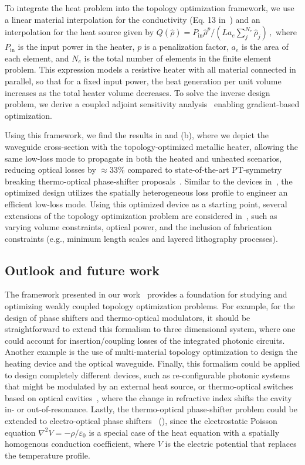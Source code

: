  To integrate the heat problem into the 
 topology optimization framework, we use a linear material interpolation 
for the conductivity (Eq. 13 in~\cite{ownpub0}) and an interpolation for the heat source given by $
 Q(\hat{\rho})=P_{\text{in}} \hat{\rho}^p / \left( L a_e \sum^{N_\text{e}}_j \hat{\rho}_j \right)\,,
$
where $P_\text{in}$ is the input power in the heater, $p$ is a penalization factor, $a_e$ is the area of each element, and 
$N_e$ is the total number of elements in the finite element problem. 
This expression models a resistive heater with all material connected in parallel, so that for a fixed input power, the heat 
generation per unit volume increases as the total heater volume decreases.
To solve the inverse design
problem, we derive a coupled adjoint sensitivity analysis~\cite{ownpub0} enabling gradient-based optimization.

Using this framework, we find the results in  and  (b), where we depict the waveguide cross-section with the topology-optimized metallic heater,
allowing the same low-loss mode to propagate in both the heated and unheated scenarios,
reducing optical losses by $\approx 33 \%$ compared to state-of-the-art PT-symmetry breaking thermo-optical phase-shifter proposals~\cite{lipson}. Similar to the devices
in~\cite{lipson}, the optimized design utilizes the spatially heterogeneous loss profile to engineer an efficient low-loss mode. Using this optimized device as a starting point, several extensions of the topology optimization problem are considered in~\cite{ownpub0}, such as varying volume constraints, optical power, and the inclusion of fabrication constraints (e.g., minimum length scales and layered 
lithography processes).

\subsection*{Outlook and future work}

The framework presented in our work~\cite{ownpub0} provides a foundation for studying and optimizing weakly coupled topology optimization problems. For example, for the design of phase shifters and thermo-optical modulators, it should be straightforward to extend this
formalism to three dimensional system, where one could account for insertion/coupling losses of the integrated photonic circuits. Another example is the use of multi-material topology optimization to design the heating device and the optical waveguide. Finally, this formalism could be applied to design completely different devices, such as re-configurable photonic systems that might be modulated by an external heat source, or thermo-optical
switches based on optical cavities~\cite{switch, switch_2}, where the change in refractive index shifts the cavity in- or out-of-resonance. Lastly, the thermo-optical phase-shifter problem could be
extended to electro-optical phase shifters~\cite{pockels} (), since the electrostatic Poisson equation $\nabla^2 V = -\rho/\varepsilon_0$ is a special case of the heat equation with a spatially homogenous
conduction coefficient, where $V$ is the electric potential that replaces the temperature profile. 

